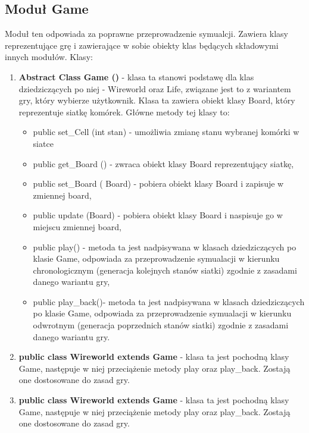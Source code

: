 \documentclass[10pt, oneside]{article}
\begin{document}
\subsection {Moduł 	Game}
Moduł ten odpowiada za poprawne przeprowadzenie symualcji. Zawiera klasy reprezentujące grę i zawierające w sobie obiekty klas będących składowymi innych modułów.
Klasy:

\begin{enumerate}
\item \textbf{Abstract Class Game ()} - klasa ta stanowi podstawę dla klas dziedziczących po niej - Wireworld oraz Life, związane jest to z wariantem gry, który wybierze użytkownik. 
					Klasa ta zawiera obiekt klasy Board, który reprezentuje siatkę komórek.
					Główne metody tej klasy to:
	\begin{itemize}
	\item public  set\_Cell (int stan) - umożliwia zmianę stanu wybranej komórki w siatce
	\item public get\_Board () - zwraca obiekt klasy Board reprezentujący siatkę,
	\item public  set\_Board ( Board) - pobiera obiekt klasy Board i zapisuje w zmiennej board,
	\item public update (Board) - pobiera obiekt klasy Board i naspisuje go w miejscu zmiennej board,
	\item public play() - metoda ta jest nadpisywana w klasach dziedziczących po klasie Game, odpowiada za przeprowadzenie symualacji w kierunku chronologicznym (generacja kolejnych stanów siatki) zgodnie z zasadami danego wariantu gry,
	\item public play\_back()- metoda ta jest nadpisywana w klasach dziedziczących po klasie Game, odpowiada za przeprowadzenie symualacji w kierunku odwrotnym (generacja poprzednich stanów siatki) zgodnie z zasadami danego wariantu gry.
 
	\end{itemize}
	

\item   \textbf{public class Wireworld extends Game} - klasa ta jest pochodną klasy Game, następuje w niej przeciążenie metody play oraz play\_back. Zostają one dostosowane do zasad gry. 
\item  \textbf{ public class Wireworld extends Game} - klasa ta jest pochodną klasy Game, następuje w niej przeciążenie metody play oraz play\_back. Zostają one dostosowane do zasad gry. 
\end{enumerate}
\end{document}
